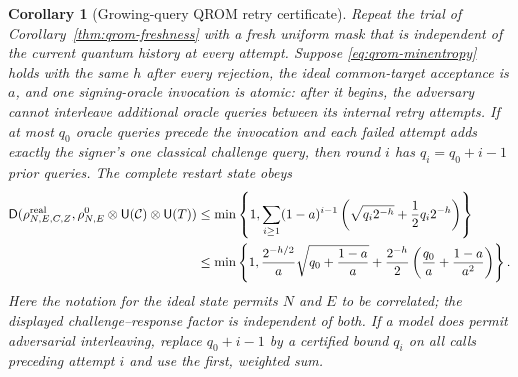 \documentclass[pdflatex,sn-mathphys-num]{sn-jnl}
\theoremstyle{thmstyleone}
\newtheorem{corollary}[theorem]{Corollary}
\theoremstyle{thmstyletwo}
\newcommand{\Unif}{\mathsf{U}}
\begin{document}
\begin{corollary}[Growing-query QROM retry certificate]
\label{cor:qrom-retry}
Repeat the trial of Corollary~\ref{thm:qrom-freshness} with a fresh uniform mask
that is independent of the current quantum history at every attempt.  Suppose
\eqref{eq:qrom-minentropy} holds with the same $h$ after every rejection, the
ideal common-target acceptance is $a$, and one signing-oracle invocation is
atomic: after it begins, the adversary cannot interleave additional oracle
queries between its internal retry attempts.  If at most $q_0$ oracle queries
precede the invocation and each failed attempt adds exactly the signer's one
classical challenge query, then round $i$ has $q_i=q_0+i-1$ prior queries.  The
complete restart state obeys
\begin{equation}
 \begin{split}
 \mathsf D(\rho_{N,E,C,Z}^{\rm real},
            \rho_{N,E}^{0}\otimes\Unif(\mathcal C)\otimes\Unif(T))
 &\le \min\left\{1,\sum_{i\ge1}(1-a)^{i-1}
 \left(\sqrt{q_i2^{-h}}+\frac12q_i2^{-h}\right)\right\}\\
 &\le \min\left\{1,
 \frac{2^{-h/2}}a\sqrt{q_0+\frac{1-a}{a}}
 +\frac{2^{-h}}2\left(\frac{q_0}a+\frac{1-a}{a^2}\right)
 \right\}.
 \end{split}
                                                        \label{eq:qrom-retry-closed}
\end{equation}
Here the notation for the ideal state permits $N$ and $E$ to be correlated;
the displayed challenge--response factor is independent of both.  If a model
does permit adversarial interleaving, replace $q_0+i-1$ by a certified bound
$q_i$ on all calls preceding attempt $i$ and use the first, weighted sum.
\end{corollary}
\end{document}
